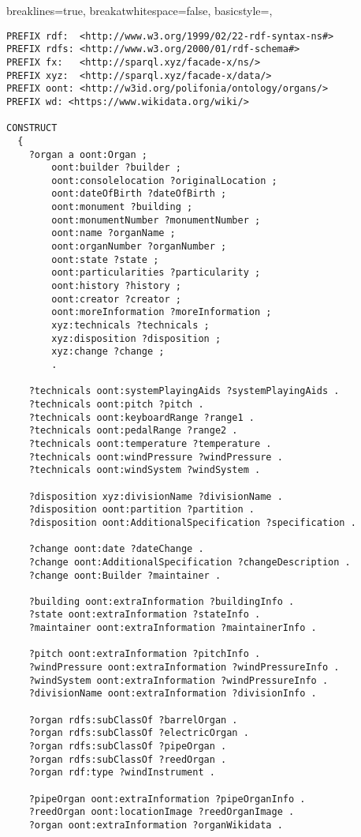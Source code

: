 \lstset
{
    breaklines=true,
    breakatwhitespace=false,
    basicstyle=\linespread{1}\ttfamily,
}
\begin{lstlisting}[caption={organ-details.sparql}]
PREFIX rdf:  <http://www.w3.org/1999/02/22-rdf-syntax-ns#>
PREFIX rdfs: <http://www.w3.org/2000/01/rdf-schema#>
PREFIX fx:   <http://sparql.xyz/facade-x/ns/>
PREFIX xyz:  <http://sparql.xyz/facade-x/data/>
PREFIX oont: <http://w3id.org/polifonia/ontology/organs/>
PREFIX wd: <https://www.wikidata.org/wiki/> 

CONSTRUCT
  {
	?organ a oont:Organ ;
		oont:builder ?builder ;
		oont:consolelocation ?originalLocation ;
		oont:dateOfBirth ?dateOfBirth ;
		oont:monument ?building ;
		oont:monumentNumber ?monumentNumber ;
		oont:name ?organName ;
		oont:organNumber ?organNumber ;
		oont:state ?state ;
		oont:particularities ?particularity ;
		oont:history ?history ;
		oont:creator ?creator ;
		oont:moreInformation ?moreInformation ;
		xyz:technicals ?technicals ; 
		xyz:disposition ?disposition ;
		xyz:change ?change ;
		.

	?technicals oont:systemPlayingAids ?systemPlayingAids .
	?technicals oont:pitch ?pitch .
	?technicals oont:keyboardRange ?range1 . 
	?technicals oont:pedalRange ?range2 . 
	?technicals oont:temperature ?temperature .
	?technicals oont:windPressure ?windPressure .
	?technicals oont:windSystem ?windSystem .
	
	?disposition xyz:divisionName ?divisionName . 
	?disposition oont:partition ?partition .
	?disposition oont:AdditionalSpecification ?specification .

	?change oont:date ?dateChange .
	?change oont:AdditionalSpecification ?changeDescription . 
	?change oont:Builder ?maintainer .

	?building oont:extraInformation ?buildingInfo .
	?state oont:extraInformation ?stateInfo .
	?maintainer oont:extraInformation ?maintainerInfo .

	?pitch oont:extraInformation ?pitchInfo .
	?windPressure oont:extraInformation ?windPressureInfo .
	?windSystem oont:extraInformation ?windPressureInfo .
	?divisionName oont:extraInformation ?divisionInfo .

	?organ rdfs:subClassOf ?barrelOrgan .
	?organ rdfs:subClassOf ?electricOrgan .
	?organ rdfs:subClassOf ?pipeOrgan .
	?organ rdfs:subClassOf ?reedOrgan .
	?organ rdf:type ?windInstrument . 

	?pipeOrgan oont:extraInformation ?pipeOrganInfo .
	?reedOrgan oont:locationImage ?reedOrganImage .
	?organ oont:extraInformation ?organWikidata .


\end{lstlisting}
